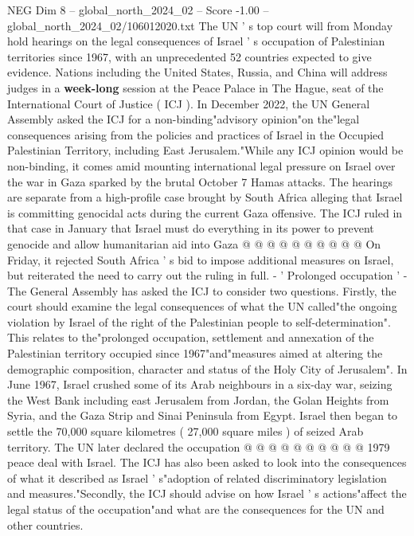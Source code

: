 \begin{textsample}{NEG Dim 8 – global\_north\_2024\_02 – Score -1.00 – global\_north\_2024\_02/106012020.txt}  \label{ex:f8_neg_236}
The UN ' s top court will from Monday hold hearings on the legal consequences of Israel ' s occupation of Palestinian territories since 1967, with an unprecedented 52 countries expected to give evidence.
Nations including the United States, Russia, and China will address judges in a \textbf{week-long} session at the Peace Palace in The Hague, seat of the International Court of Justice ( ICJ ).
In December 2022, the UN General Assembly asked the ICJ for a non-binding"advisory opinion"on the"legal consequences arising from the policies and practices of Israel in the Occupied Palestinian Territory, including East Jerusalem."While any ICJ opinion would be non-binding, it comes amid mounting international legal pressure on Israel over the war in Gaza sparked by the brutal October 7 Hamas attacks.
The hearings are separate from a high-profile case brought by South Africa alleging that Israel is committing genocidal acts during the current Gaza offensive.
The ICJ ruled in that case in January that Israel must do everything in its power to prevent genocide and allow humanitarian aid into Gaza @ @ @ @ @ @ @ @ @ @ On Friday, it rejected South Africa ' s bid to impose additional measures on Israel, but reiterated the need to carry out the ruling in full. - ' Prolonged occupation ' - The General Assembly has asked the ICJ to consider two questions.
Firstly, the court should examine the legal consequences of what the UN called"the ongoing violation by Israel of the right of the Palestinian people to self-determination".
This relates to the"prolonged occupation, settlement and annexation of the Palestinian territory occupied since 1967"and"measures aimed at altering the demographic composition, character and status of the Holy City of Jerusalem".
In June 1967, Israel crushed some of its Arab neighbours in a six-day war, seizing the West Bank including east Jerusalem from Jordan, the Golan Heights from Syria, and the Gaza Strip and Sinai Peninsula from Egypt.
Israel then began to settle the 70,000 square kilometres ( 27,000 square miles ) of seized Arab territory.
The UN later declared the occupation @ @ @ @ @ @ @ @ @ @ 1979 peace deal with Israel.
The ICJ has also been asked to look into the consequences of what it described as Israel ' s"adoption of related discriminatory legislation and measures."Secondly, the ICJ should advise on how Israel ' s actions"affect the legal status of the occupation"and what are the consequences for the UN and other countries.

\end{textsample}
